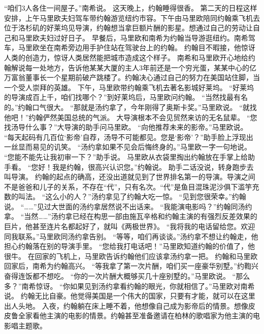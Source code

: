 \documentclass[a4paper,12pt,UTF8,twoside]{ctexbook}
\begin{document}
        “咱们3人各住一间屋子。”南希说。  
        这天晚上，约翰睡得很香。  
        第二天的日程这样安排，上午马里欧夫妇驾车带约翰游览纽约市容。下午由马里欧陪同约翰乘飞机去位于洛杉矶的好莱坞见导演，约翰想当拿巨额片酬的影星。想通过自己的劳动让自己和马里欧夫妇过好日子。        
        早餐后，马里欧和南希为约翰当导游逛纽约。南希驾车，马里欧坐在南希旁边用手护住站在驾驶台上的约翰。  
        约翰目不暇接，他惊讶人类的创造力，惊讶人类居然能把城市造成这个样子。  
        南希和马里欧开心地给约翰解说每一处地方，告诉他某某大厦的主人3年前还是一个穷光蛋，某某中心的亿万富翁董事长一个星期前破产跳楼了。约翰决心通过自己的努力在美国站住脚，当一个受人崇拜的英雄。  
        下午，马里欧带约翰乘飞机去著名影城好莱坞。  
        “好莱坞的导演成百上千，咱们找哪个？”到好莱坞后，马里欧问约翰。  
        “当然找最有名的。”约翰口气很大。  
        “那就是汤约拿了，今年刚得了奥斯卡奖。”马里欧说。  
        “就找他吧！”约翰俨然美国总统的气派。  
        大导演根本不会见贸然来访的无名鼠辈。  
        “您找汤导什么事？”大导演的助手问马里欧。  
        “向他推荐未来的影帝。”马里欧说。  
        “每天起码有几百位‘影帝’自荐，汤导不可能都见。您是‘影帝’？”助手脸上浮现出一丝显而易见的讥笑。  
        “汤约拿如果不见会后悔终身的。”马里欧一字一句地说。  
        “您能不能先让我初审一下？”助手说。  
        马里欧从衣袋里掏出约翰放在手掌上给助手看。  
        “您好！我是约翰，很高兴认识您。”约翰说。  
        助手二话没说，转身跑步去叫导演。  
        约翰的起点的确高，还没出道就见到了世界排名第一的导演。导演之间不是爸爸和儿子的关系，不存在“代”，只有名次。“代”是鱼目混珠泥沙俱下滥竽充数的叫法。  
        “这么小的人？”汤约拿见了约翰大吃一惊。  
        “见到您很荣幸。”约翰说。  
        “……”见过大世面的汤约拿居然说不出话来。  
        “我能演电影吗？”约翰同汤约拿。  
        “当然……”汤约拿已经在构思一部由施瓦辛格和约翰主演的有强烈反差效果的巨片，他甚至连片名都起好了，就叫《两极世界》。  
        “我将我的电话留给您。欢迎同我联系。”马里欧同汤约拿告别。  
        “等等，咱们再谈谈。”汤约拿不想让约翰走，他担心约翰落在别的导演手里。  
        “您给我打电话吧！”马里欧知道约翰的价值了，他很牛。  
        在回家的飞机上，马里欧告诉约翰他们应该拿汤约拿一把。        
        约翰和马里欧回家后，南希为约翰高兴。  
        “等我拿了第一次片酬，咱们买一座豪华别墅。”约鞫兴奋得连饭都不想吃。  
        “你的一次片酬大概够买几十座别墅的。”马里欧说。  
        “那么多？”南希惊讶。  
        “你如果见到汤约拿看约翰的眼光，你就相信了。”马里欧对南希说。  
        约翰无比自豪。他觉得美国是一个伟大的国家，只要有才能，就可以在这里出人头地。  
        入夜，约翰躺在床上睡不着，他想像自己成为影帝后的情景。想像皮皮鲁全家看他主演的电影的情景。约翰甚至准备邀请在柏林的歌唱家为他主演的电影唱主题歌。  
\end{document}
